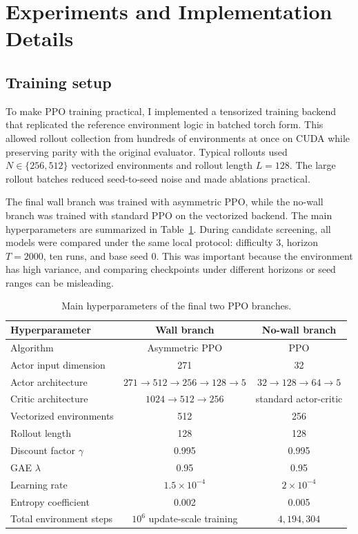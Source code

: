 \documentclass[11pt, oneside]{article}   	%
\begin{document}
\section{Experiments and Implementation Details}

\subsection{Training setup}

To make PPO training practical, I implemented a tensorized training backend that replicated the reference environment logic in batched torch form. This allowed rollout collection from hundreds of environments at once on CUDA while preserving parity with the original evaluator. Typical rollouts used \(N\in\{256,512\}\) vectorized environments and rollout length \(L=128\). The large rollout batches reduced seed-to-seed noise and made ablations practical.

The final wall branch was trained with asymmetric PPO, while the no-wall branch was trained with standard PPO on the vectorized backend. The main hyperparameters are summarized in Table~\ref{tab:hparams}. During candidate screening, all models were compared under the same local protocol: difficulty 3, horizon \(T=2000\), ten runs, and base seed 0. This was important because the environment has high variance, and comparing checkpoints under different horizons or seed ranges can be misleading.

\begin{table}[H]
\centering
\small
\begin{tabular}{lcc}
\toprule
Hyperparameter & Wall branch & No-wall branch \\
\midrule
Algorithm & Asymmetric PPO & PPO \\
Actor input dimension & 271 & 32 \\
Actor architecture & \(271\!\to\!512\!\to\!256\!\to\!128\!\to\!5\) & \(32\!\to\!128\!\to\!64\!\to\!5\) \\
Critic architecture & \(1024\!\to\!512\!\to\!256\) & standard actor-critic \\
Vectorized environments & 512 & 256 \\
Rollout length & 128 & 128 \\
Discount factor \(\gamma\) & 0.995 & 0.995 \\
GAE \(\lambda\) & 0.95 & 0.95 \\
Learning rate & \(1.5\times 10^{-4}\) & \(2\times10^{-4}\) \\
Entropy coefficient & 0.002 & 0.005 \\
Total environment steps & \(10^6\) update-scale training & \(4{,}194{,}304\) \\
\bottomrule
\end{tabular}
\caption{Main hyperparameters of the final two PPO branches.}
\label{tab:hparams}
\end{table}
\end{document}
